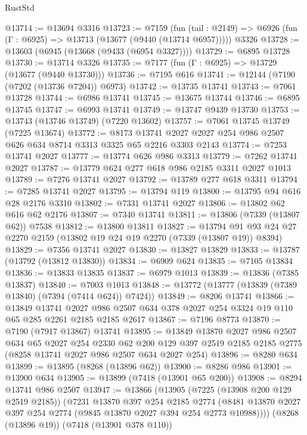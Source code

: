 \begin{lexlean}{RustStd}
\begin{coremodule}
@13714 := @13694 @3316
@13723 := @7159
    (fun (tail : @2149) => @6926 (fun (Γ : @6925) => @13713 (@13677 (@9440 (@13714 @6957)))))
    @3326
@13728 := @13603 (@6945 (@13668 (@9433 (@6954 @3327))))
@13729 := @6895 @13728
@13730 := @13714 @3326
@13735 := @7177 (fun (Γ : @6925) => @13729 (@13677 (@9440 @13730)))
@13736 := @7195 @616
@13741 := @12144 (@7190 (@7202 (@13736 @7204)) @6973)
@13742 := @13735 @13741
@13743 := @7061 @13728
@13744 := @6986 @13741
@13745 := @13675 @13744
@13746 := @6895 @13745
@13747 := @6993 @13741
@13749 := @13747 @9439 @13730
@13753 := @13743 (@13746 @13749) (@7220 @13602)
@13757 := @7061 @13745 @13749 (@7225 @13674)
@13772 := @8173 @13741 @2027 @2027 @254 @986 @2507 @626 @634 @8714 @3313 @3325 @65 @2216 @3303 @2143
@13774 := @7253 @13741 @2027
@13777 := @13774 @626 @986 @3313
@13779 := @7262 @13741 @2027
@13787 := @13779 @624 @277 @618 @986 @2185 @3311 @2027 @1013
@13789 := @7276 @13741 @2027
@13792 := @13789 @277 @618 @3311
@13794 := @7285 @13741 @2027
@13795 := @13794 @119
@13800 := @13795 @94 @616 @28 @2176 @3310
@13802 := @7331 @13741 @2027
@13806 := @13802 @62 @616 @62 @2176
@13807 := @7340 @13741
@13811 := @13806 (@7339 (@13807 @62)) @7538
@13812 := @13800 @13811
@13827 := @13794 @91 @93 @24 @27 @2270 @2159 (@13802 @19 @24 @19 @2270 (@7339 (@13807 @19)) @8394)
@13829 := @7356 @13741 @2027
@13830 := @13827 @13829
@13833 := @13787 (@13792 (@13812 @13830))
@13834 := @6909 @624
@13835 := @7105 @13834
@13836 := @13833 @13835
@13837 := @6979 @1013
@13839 := @13836 (@7385 @13837)
@13840 := @7003 @1013
@13848 := @13772 (@13777 (@13839 (@7389 @13840) (@7394 (@7414 @624)) @7424))
@13849 := @8206 @13741
@13866 := @13849
    @13741
    @2027
    @986
    @2507
    @634
    @378
    @2027
    @254
    @3324
    @19
    @110
    @65
    @285
    @2261
    @2185
    @2185
    @2617
@13867 := @7196 @8773
@13870 := @7190 (@7917 @13867) @13741
@13895 := @13849
    @13870
    @2027
    @986
    @2507
    @634
    @65
    @2027
    @254
    @2330
    @62
    @200
    @129
    @397
    @2519
    @2185
    @2185
    @2775
    (@8258 @13741 @2027 @986 @2507 @634 @2027 @254)
@13896 := @8280 @634
@13899 := @13895 (@8268 (@13896 @62))
@13900 := @8286 @986
@13901 := @13900 @634
@13905 := @13899 (@7418 (@13901 @65 @200))
@13908 := @8294 @13741 @986 @2507
@13947 := @13866
    (@13905
      (@7225 (@13908 @200 @129 @2519 @2185))
      (@7231
        @13870
        @397
        @254
        @2185
        @2774
        (@8481 @13870 @2027 @397 @254 @2774 (@9845 @13870 @2027 @394 @254 @2773 @10988))))
    (@8268 (@13896 @19))
    (@7418 (@13901 @378 @110))

\end{coremodule}
\end{lexlean}
